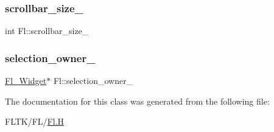 \subsubsection{\texorpdfstring{scrollbar\+\_\+size\+\_\+}{scrollbar\_size\_}}
{\footnotesize\ttfamily int Fl\+::scrollbar\+\_\+size\+\_\+\hspace{0.3cm}{\ttfamily [static]}}

\mbox{\label{class_fl_a17de154975511e6a8dc1f6efd83f96ce}} 
\subsubsection{\texorpdfstring{selection\+\_\+owner\+\_\+}{selection\_owner\_}}
{\footnotesize\ttfamily \hyperlink{class_fl___widget}{Fl\+\_\+\+Widget}$\ast$ Fl\+::selection\+\_\+owner\+\_\+\hspace{0.3cm}{\ttfamily [static]}}



The documentation for this class was generated from the following file\+:\begin{DoxyCompactItemize}
\item 
F\+L\+T\+K/\+F\+L/\hyperlink{_fl_8_h}{Fl.\+H}\end{DoxyCompactItemize}

